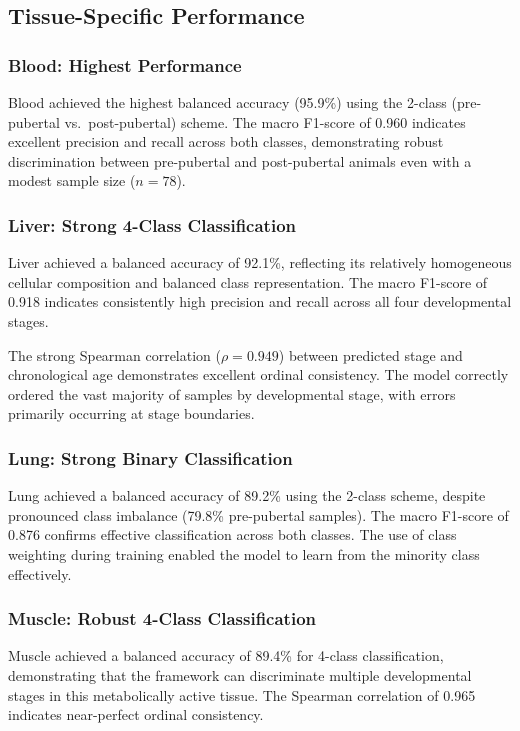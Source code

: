 \subsection{Tissue-Specific Performance}

\subsubsection{Blood: Highest Performance}

Blood achieved the highest balanced accuracy (95.9\%) using the 2-class (pre-pubertal vs.\ post-pubertal) scheme. The macro F1-score of 0.960 indicates excellent precision and recall across both classes, demonstrating robust discrimination between pre-pubertal and post-pubertal animals even with a modest sample size ($n = 78$).

\subsubsection{Liver: Strong 4-Class Classification}

Liver achieved a balanced accuracy of 92.1\%, reflecting its relatively homogeneous cellular composition and balanced class representation. The macro F1-score of 0.918 indicates consistently high precision and recall across all four developmental stages.

The strong Spearman correlation ($\rho = 0.949$) between predicted stage and chronological age demonstrates excellent ordinal consistency. The model correctly ordered the vast majority of samples by developmental stage, with errors primarily occurring at stage boundaries.

\subsubsection{Lung: Strong Binary Classification}

Lung achieved a balanced accuracy of 89.2\% using the 2-class scheme, despite pronounced class imbalance (79.8\% pre-pubertal samples). The macro F1-score of 0.876 confirms effective classification across both classes. The use of class weighting during training enabled the model to learn from the minority class effectively.

\subsubsection{Muscle: Robust 4-Class Classification}

Muscle achieved a balanced accuracy of 89.4\% for 4-class classification, demonstrating that the framework can discriminate multiple developmental stages in this metabolically active tissue. The Spearman correlation of 0.965 indicates near-perfect ordinal consistency.

